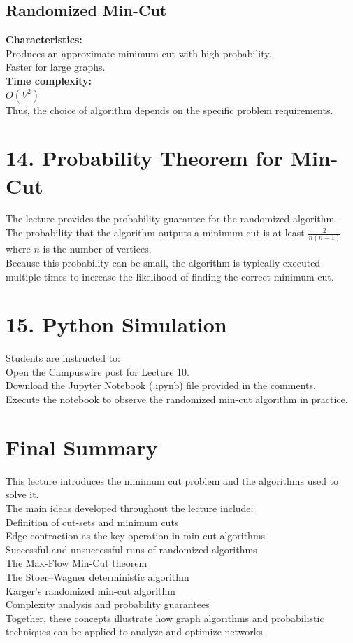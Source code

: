 \documentclass{article}
\begin{document}
\subsection{Randomized Min-Cut}
\textbf{Characteristics:} \\
Produces an approximate minimum cut with high probability. \\
Faster for large graphs. \\
\textbf{Time complexity:} \\
$O(V^2)$ \\
Thus, the choice of algorithm depends on the specific problem requirements.

\section{14. Probability Theorem for Min-Cut}
The lecture provides the probability guarantee for the randomized algorithm. \\
The probability that the algorithm outputs a minimum cut is at least $\frac{2}{n(n-1)}$ \\
where $n$ is the number of vertices. \\
Because this probability can be small, the algorithm is typically executed multiple times to increase the likelihood of finding the correct minimum cut.

\section{15. Python Simulation}
Students are instructed to: \\
Open the Campuswire post for Lecture 10. \\
Download the Jupyter Notebook (.ipynb) file provided in the comments. \\
Execute the notebook to observe the randomized min-cut algorithm in practice.

\section{Final Summary}
This lecture introduces the minimum cut problem and the algorithms used to solve it. \\
The main ideas developed throughout the lecture include: \\
Definition of cut-sets and minimum cuts \\
Edge contraction as the key operation in min-cut algorithms \\
Successful and unsuccessful runs of randomized algorithms \\
The Max-Flow Min-Cut theorem \\
The Stoer–Wagner deterministic algorithm \\
Karger's randomized min-cut algorithm \\
Complexity analysis and probability guarantees \\
Together, these concepts illustrate how graph algorithms and probabilistic techniques can be applied to analyze and optimize networks.
\end{document}
